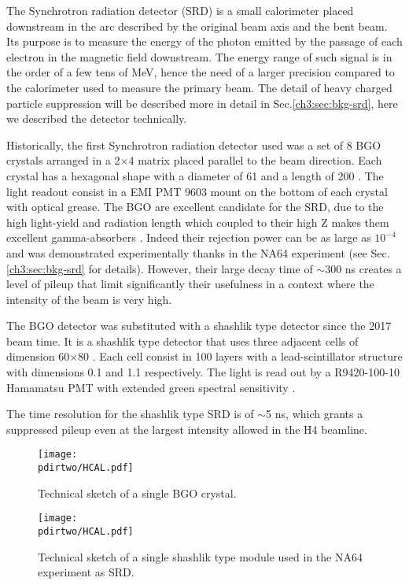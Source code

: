 The Synchrotron radiation detector (SRD) is a small calorimeter placed downstream in the arc described by the original beam axis and the bent beam. Its purpose is to measure the energy of the photon emitted by the passage of each electron in the magnetic field downstream. The energy range of such signal is in the order of a few tens of MeV, hence the need of a larger precision compared to the calorimeter used to measure the primary beam. The detail of heavy charged particle suppression will be described more in detail in Sec.\ref{ch3:sec:bkg-srd}, here we described the detector technically.

Historically, the first Synchrotron radiation detector used was a set of 8 BGO crystals arranged in a 2$\times$4 matrix placed parallel to the beam direction. Each crystal has a hexagonal shape with a diameter of 61 \mmi and a length of 200 \mmi. The light readout consist in a EMI PMT 9603 mount on the bottom of each crystal with optical grease. The BGO are excellent candidate for the SRD, due to the high light-yield and radiation length which coupled to their high Z makes them excellent gamma-absorbers \cite{bgo-crystal}. Indeed their rejection power can be as large as $10^{-4}$ and was demonstrated experimentally thanks in the NA64 experiment (see Sec.\ref{ch3:sec:bkg-srd} for details). However, their large decay time of $\sim$300 \si{ns} creates a level of pileup that limit significantly their usefulness in a context where the intensity of the beam is very high.

The BGO detector was substituted with a shashlik type detector since the 2017 beam time. It is a shashlik type detector that uses three adjacent cells of dimension 60$\times$80 \mmi. Each cell consist in 100 layers with a lead-scintillator structure with dimensions 0.1 \mmi and 1.1 \mmi respectively. The light is read out by a R9420-100-10 Hamamatsu PMT with extended green spectral sensitivity \cite{hamamatsu-R9420-100-10}.

The time resolution for the shashlik type SRD is of $\sim$5 \si{ns}, which grants a suppressed pileup even at the largest intensity allowed in the H4 beamline.

\begin{figure}[bth!]
  \centering
  \texttt{[image: \\pdirtwo/HCAL.pdf]}
  \caption[BGO sketch]{Technical sketch of a single BGO crystal.}
  \label{fig:bgo-sketch}
\end{figure}

\begin{figure}[bth!]
  \centering
  \texttt{[image: \\pdirtwo/HCAL.pdf]}
  \caption[SRD sketch]{Technical sketch of a single shashlik type module used in the NA64 experiment as SRD.}
  \label{fig:srd-sketch}
\end{figure}

